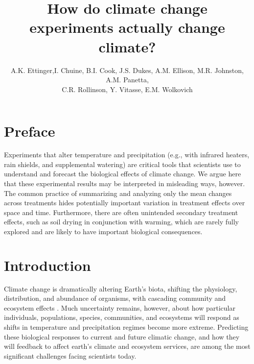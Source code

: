 \documentclass{article}
\begin{document}
 
\title{How do climate change experiments actually change climate?} %
\author{A.K. Ettinger,I. Chuine, B.I. Cook, J.S. Dukes, A.M. Ellison, M.R. Johnston, A.M. Panetta,\\ C.R. Rollinson, Y. Vitasse, E.M. Wolkovich}
\maketitle  %
\section* {Preface}
\par Experiments that alter temperature and precipitation (e.g., with infrared heaters, rain shields, and supplemental watering) are critical tools that scientists use to understand and forecast the biological effects of climate change. We argue here that these experimental results may be interpreted in misleading ways, however. 
The common practice of summarizing and analyzing only the mean changes across treatments hides potentially important variation in treatment effects over space and time. Furthermore, there are often unintended secondary treatment effects, such as soil drying in conjunction with warming, which are rarely fully explored and are likely to have important biological consequences. %
\section* {Introduction}
\par Climate change is dramatically altering Earth's biota, shifting the physiology, distribution, and abundance of organisms, with cascading community and ecosystem effects \citep{shukla1982,cox2000,thomas2004,parmesan2006,field2007,sheldon2011,urban2012}. Much uncertainty remains, however, about how particular individuals, populations, species, communities, and ecosystems will respond as shifts in temperature and precipitation regimes become more extreme. Predicting these biological responses to current and future climatic change, and how they will feedback to affect earth's climate and ecosystem services, are among the most significant challenges facing scientists today.
\end{document}
